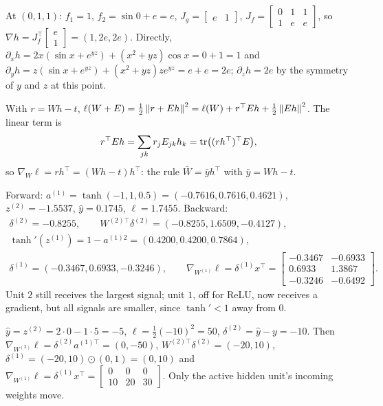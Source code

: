 \section{}

At $(0,1,1)$: $f_1 = 1$, $f_2 = \sin0 + e = e$, $J_g = \begin{bmatrix}e & 1\end{bmatrix}$, $J_f = \begin{bmatrix}0 & 1 & 1\\ 1 & e & e\end{bmatrix}$, so
$\nabla h = J_f^\top\begin{bmatrix}e\\1\end{bmatrix} = (1, 2e, 2e)$. Directly, $\partial_xh = 2x(\sin x + e^{yz}) + (x^2 + yz)\cos x = 0 + 1 = 1$ and
$\partial_yh = z(\sin x + e^{yz}) + (x^2 + yz)ze^{yz} = e + e = 2e$; $\partial_zh = 2e$ by the symmetry of $y$ and $z$ at this point.

With $r = Wh - t$, $\ell(W + E) = \frac12\left\|r + Eh\right\|^2 = \ell(W) + r^\top Eh + \frac12\left\|Eh\right\|^2$. The linear term is
\[
  r^\top Eh = \sum_{jk}r_jE_{jk}h_k = \operatorname{tr}\bigl((rh^\top)^\top E\bigr),
\]
so $\nabla_W\ell = rh^\top = (Wh - t)h^\top$: the rule $\bar W = \bar yh^\top$ with $\bar y = Wh - t$.

Forward: $a^{(1)} = \tanh(-1, 1, 0.5) = (-0.7616, 0.7616, 0.4621)$, $z^{(2)} = -1.5537$, $\hat y = 0.1745$, $\ell = 1.7455$.
Backward:
\begin{gather*}
  \delta^{(2)} = -0.8255,\qquad W^{(2)\top}\delta^{(2)} = (-0.8255, 1.6509, -0.4127),\\
  \tanh'(z^{(1)}) = 1 - a^{(1)2} = (0.4200, 0.4200, 0.7864),\\
  \delta^{(1)} = (-0.3467, 0.6933, -0.3246),\qquad
  \nabla_{W^{(1)}}\ell = \delta^{(1)}x^\top = \begin{bmatrix}-0.3467 & -0.6933\\ 0.6933 & 1.3867\\ -0.3246 & -0.6492\end{bmatrix} .
\end{gather*} Unit $2$ still receives the largest signal; unit $1$, off for ReLU, now
receives a gradient, but all signals are smaller, since $\tanh'<1$ away from $0$.

$\hat y = z^{(2)} = 2\cdot0 - 1\cdot5 = -5$, $\ell = \frac12(-10)^2 = 50$, $\delta^{(2)} = \hat y - y = -10$. Then
$\nabla_{W^{(2)}}\ell = \delta^{(2)}a^{(1)\top} = (0, -50)$, $W^{(2)\top}\delta^{(2)} = (-20, 10)$, $\delta^{(1)} = (-20,10)\odot(0,1) = (0, 10)$ and
$\nabla_{W^{(1)}}\ell = \delta^{(1)}x^\top = \begin{bmatrix}0&0&0\\10&20&30\end{bmatrix}$. Only the active hidden unit's incoming weights move.


